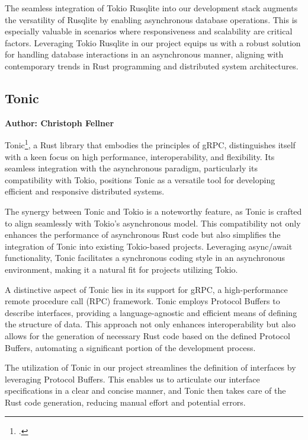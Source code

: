 The seamless integration of Tokio Rusqlite into our development stack augments the versatility of Rusqlite by enabling asynchronous database operations. This is 
especially valuable in scenarios where responsiveness and scalability are critical factors. Leveraging Tokio Rusqlite in our project equips us with a robust 
solution for handling database interactions in an asynchronous manner, aligning with contemporary trends in Rust programming and distributed system 
architectures.

\subsection{Tonic}
\textbf{Author: Christoph Fellner}

Tonic\footcite{tonic}, a Rust library that embodies the principles of gRPC, distinguishes itself with a keen focus on high performance, interoperability, and 
flexibility. Its seamless integration with the asynchronous paradigm, particularly its compatibility with Tokio, positions Tonic as a versatile tool for 
developing efficient and responsive distributed systems.\newline

The synergy between Tonic and Tokio is a noteworthy feature, as Tonic is crafted to align seamlessly with Tokio's asynchronous model. This compatibility not 
only enhances the performance of asynchronous Rust code but also simplifies the integration of Tonic into existing Tokio-based projects. Leveraging async/await 
functionality, Tonic facilitates a synchronous coding style in an asynchronous environment, making it a natural fit for projects utilizing Tokio.\newline

A distinctive aspect of Tonic lies in its support for gRPC, a high-performance remote procedure call (RPC) framework. Tonic employs Protocol Buffers to describe 
interfaces, providing a language-agnostic and efficient means of defining the structure of data. This approach not only enhances interoperability but also 
allows for the generation of necessary Rust code based on the defined Protocol Buffers, automating a significant portion of the development process.\newline

The utilization of Tonic in our project streamlines the definition of interfaces by leveraging Protocol Buffers. This enables us to articulate our interface 
specifications in a clear and concise manner, and Tonic then takes care of the Rust code generation, reducing manual effort and potential errors.\newline

